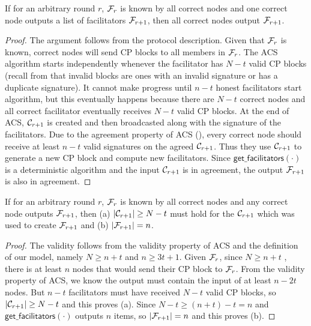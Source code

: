 \begin{lemma}
\label{lemma:agreement}
If for an arbitrary round $r$,
$\mathcal{F}_{r}$ is known by all correct nodes and one correct node outputs a list of facilitators $\mathcal{F}_{r+1}$,
then all correct nodes output $\mathcal{F}_{r+1}$.
\end{lemma}
\begin{proof}
The argument follows from the protocol description.
Given that $\mathcal{F}_r$ is known,
correct nodes will send CP blocks to all members in $\mathcal{F}_r$.
The ACS algorithm starts independently whenever the facilitator has $N - t$ valid CP blocks
(recall from  that invalid blocks are ones with an invalid signature or has a duplicate signature).
It cannot make progress until $n-t$ honest facilitators start algorithm,
but this eventually happens because there are $N - t$ correct nodes and all correct facilitator eventually receives $N -t$ valid CP blocks.
At the end of ACS, $\mathcal{C}_{r+1}$ is created and then broadcasted along with the signature of the facilitators.
Due to the agreement property of ACS (),
every correct node should receive at least $n - t$ valid signatures on the agreed $\mathcal{C}_{r+1}$.
Thus they use $\mathcal{C}_{r+1}$ to generate a new CP block and compute new facilitators.
Since $\textsf{get\_facilitators}(\cdot)$ is a deterministic algorithm and the input $\mathcal{C}_{r+1}$ is in agreement, the output $\mathcal{F}_{r+1}$ is also in agreement.
\end{proof}

\begin{lemma}
\label{lemma:validity}
If for an arbitrary round $r$,
$\mathcal{F}_r$ is known by all correct nodes and any correct node outputs $\mathcal{F}_{r+1}$,
then (a) $|\mathcal{C}_{r+1}| \ge N - t$ must hold for the $\mathcal{C}_{r+1}$ which was used to create $\mathcal{F}_{r+1}$ and (b) $|\mathcal{F}_{r+1}| = n$.
\end{lemma}
\begin{proof}
The validity follows from the validity property of ACS and the definition of our model,
namely $N \ge n + t$ and $n \ge 3t + 1$.
Given $\mathcal{F}_r$, since $N \ge n + t$ , there is at least $n$ nodes that would send their CP block to $\mathcal{F}_r$.
From the validity property of ACS, we know the output must contain the input of at least $n - 2t$ nodes.
But $n -t$ facilitators must have received $N - t$ valid CP blocks, so $|\mathcal{C}_{r+1}| \ge N-t$ and this proves (a).
Since $N-t \ge (n+t) -t = n$ and $\textsf{get\_facilitators}(\cdot)$ outputs $n$ items, so $|\mathcal{F}_{r+1}| = n$ and this proves (b).
\end{proof}

